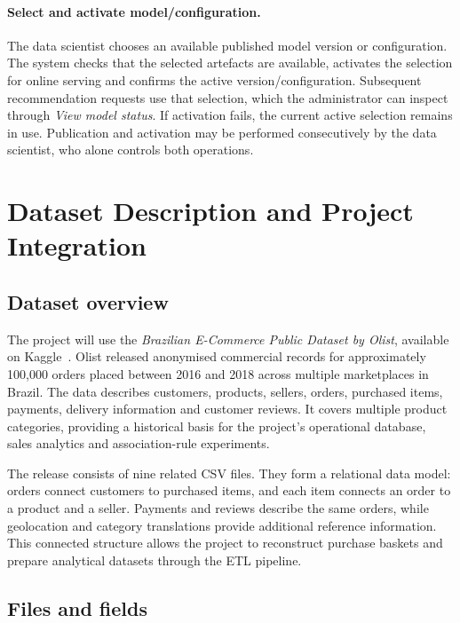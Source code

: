 \documentclass[a4paper,12pt]{article}
\begin{document}
\paragraph{Select and activate model/configuration.}
The data scientist chooses an available published model version or configuration. The system checks
that the selected artefacts are available, activates the selection for online serving and confirms
the active version/configuration. Subsequent recommendation requests use that selection, which the
administrator can inspect through \emph{View model status}. If activation fails, the current active
selection remains in use. Publication and activation may be performed consecutively by the data
scientist, who alone controls both operations.

\clearpage
\section{Dataset Description and Project Integration}
\label{sec:dataset}

\subsection{Dataset overview}

The project will use the \emph{Brazilian E-Commerce Public Dataset by Olist},
available on Kaggle~\cite{olist2026}. Olist released anonymised commercial records
for approximately 100,000 orders placed between 2016 and 2018 across multiple
marketplaces in Brazil. The data describes customers, products, sellers, orders,
purchased items, payments, delivery information and customer reviews. It covers
multiple product categories, providing a historical basis for the project's
operational database, sales analytics and association-rule experiments.

The release consists of nine related CSV files. They form a relational data model:
orders connect customers to purchased items, and each item connects an order to a
product and a seller. Payments and reviews describe the same orders, while
geolocation and category translations provide additional reference information.
This connected structure allows the project to reconstruct purchase baskets and
prepare analytical datasets through the ETL pipeline.

\subsection{Files and fields}
\end{document}
